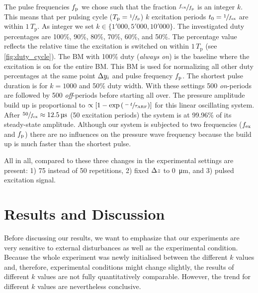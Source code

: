 The pulse frequencies $f_{\mathrm{p}}$ we chose such that the fraction $\sfrac{f_{\mathrm{ex}}}{f_{\mathrm{p}}}$ 
is an integer $k$. This means that per pulsing cycle 
($T_{\mathrm{p}}=\sfrac{1}{f_{\mathrm{p}}}$) $k$ excitation periods 
$t_{0}=\sfrac{1}{f_{\mathrm{ex}}}$ are within $1\,T_{\mathrm{p}}$. As integer we set 
$k\in\{1'000, 5'000, 10'000\}$. The investigated duty percentages are 100\%, 
90\%, 80\%, 70\%, 60\%, and 50\%. The percentage value reflects the relative 
time the excitation is switched on within $1\,T_{\mathrm{p}}$ (see 
\cref{fig:duty_cycle}). The BM with 100\% duty (\emph{always on}) is the 
baseline where the excitation is on for the entire BM. This BM is used for 
normalizing all other duty percentages at the same point $\Delta y_{i}$ and pulse 
frequency $f_{\mathrm{p}}$. The shortest pulse duration is for $k=1000$ and 50\% duty 
width. With these settings 500 \emph{on}-periods are followed by 500 
\emph{off}-periods before starting all over. The pressure amplitude build up is 
proportional to $\propto\left[ 1-\exp\left( \sfrac{-t}{\tau_{\mathrm{ARF}}} 
\right) \right]$ for this linear oscillating system. After 
$\sfrac{50}{\fex}\approx\SI{12.5}{\us}$ (50 excitation periods) the system is 
at 99.96\% of its steady-state amplitude. Although our system is subjected to 
two frequencies ($f_{\mathrm{ex}}$ and $f_{\mathrm{p}}$) there are no influences on the pressure wave 
frequency because the build up is much faster than the shortest pulse.

All in all, compared to \cite{Goering2021} these three changes in the 
experimental settings are present: 1) 75 instead of 50 repetitions, 2) fixed 
$\Delta z$ to \SI{0}{\um}, and 3) pulsed excitation signal.

\section{Results and Discussion}

Before discussing our results, we want to emphasize that our experiments are 
very sensitive to external disturbances as well as the experimental condition. 
Because the whole experiment was newly initialised between the different $k$ 
values and, therefore, experimental conditions might change slightly, the 
results of different $k$ values are not fully quantitatively comparable. 
However, the trend for different $k$ values are nevertheless conclusive.

